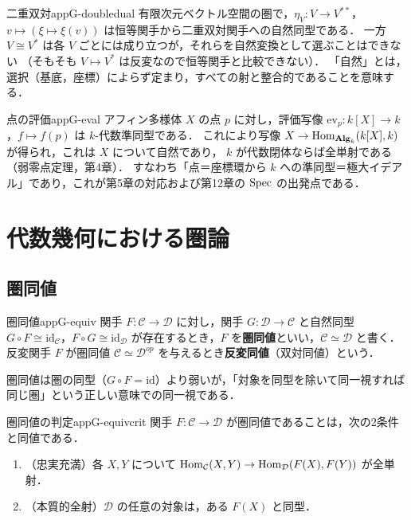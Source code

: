 \begin{myex}{二重双対}{appG-doubledual}
有限次元ベクトル空間の圏で，$\eta_V\colon V\to V^{**}$，$v\mapsto(\xi\mapsto\xi(v))$ は恒等関手から二重双対関手への自然同型である．
一方 $V\cong V^*$ は各 $V$ ごとには成り立つが，それらを自然変換として選ぶことはできない
（そもそも $V\mapsto V^*$ は反変なので恒等関手と比較できない）．
「自然」とは，選択（基底，座標）によらず定まり，すべての射と整合的であることを意味する．
\end{myex}

\begin{myex}{点の評価}{appG-eval}
アフィン多様体 $X$ の点 $p$ に対し，評価写像 $\mathrm{ev}_p\colon k[X]\to k$，$f\mapsto f(p)$ は $k$-代数準同型である．
これにより写像 $X\to\operatorname{Hom}_{\mathbf{Alg}_k}(k[X],k)$ が得られ，これは $X$ について自然であり，
$k$ が代数閉体ならば全単射である（弱零点定理，第4章）．
すなわち「点＝座標環から $k$ への準同型＝極大イデアル」であり，これが第5章の対応および第12章の $\operatorname{Spec}$ の出発点である．
\end{myex}

\section{代数幾何における圏論}

\subsection*{圏同値}

\begin{mydef}{圏同値}{appG-equiv}
関手 $F\colon\mathcal C\to\mathcal D$ に対し，関手 $G\colon\mathcal D\to\mathcal C$ と自然同型
$G\circ F\cong\mathrm{id}_{\mathcal C}$，$F\circ G\cong\mathrm{id}_{\mathcal D}$ が存在するとき，$F$ を\textbf{圏同値}といい，$\mathcal C\simeq\mathcal D$ と書く．
反変関手 $F$ が圏同値 $\mathcal C\simeq\mathcal D^{op}$ を与えるとき\textbf{反変同値}（双対同値）という．
\end{mydef}

圏同値は圏の同型（$G\circ F=\mathrm{id}$）より弱いが，「対象を同型を除いて同一視すれば同じ圏」という正しい意味での同一視である．

\begin{myprop}{圏同値の判定}{appG-equivcrit}
関手 $F\colon\mathcal C\to\mathcal D$ が圏同値であることは，次の2条件と同値である．
\begin{enumerate}
\item（忠実充満）各 $X,Y$ について $\operatorname{Hom}_{\mathcal C}(X,Y)\to\operatorname{Hom}_{\mathcal D}(F(X),F(Y))$ が全単射．
\item（本質的全射）$\mathcal D$ の任意の対象は，ある $F(X)$ と同型．
\end{enumerate}
\end{myprop}

